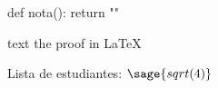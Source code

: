 \documentclass[a4paper, 12pt]{scrartcl}
\begin{document}
\begin{sagesilent}
def nota():
    return ""
\end{sagesilent}

text the proof in \LaTeX

Lista de estudiantes: $\sage{sqrt(4)}$
\end{document}
